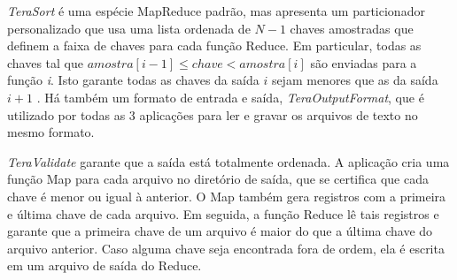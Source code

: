 \textit{TeraSort} é uma espécie MapReduce padrão, mas apresenta um particionador personalizado que usa uma lista ordenada de $ N-1 $ chaves amostradas que definem a faixa de chaves para cada função Reduce. 
Em particular, todas as chaves tal que $amostra [i-1] \le chave < amostra[i] $ são enviadas para a função \textit{i}. 
Isto garante todas as chaves da saída $i$ sejam menores que as da saída $i + 1$ .
Há também um formato de entrada e saída, \textit{TeraOutputFormat}, que é utilizado	 por todas as 3 aplicações  para ler e gravar os arquivos de texto no mesmo formato. 



\textit{TeraValidate} garante que a saída está totalmente ordenada. A aplicação cria uma função Map para cada arquivo no diretório de saída, que se certifica que cada chave é  menor ou igual à anterior. O Map também gera registros com a primeira e última chave de cada arquivo. Em seguida, a função Reduce lê tais registros e garante que a primeira chave de um arquivo é maior do que a última chave do arquivo anterior. Caso alguma chave seja encontrada fora de ordem, ela é escrita em um  arquivo de saída do Reduce.


